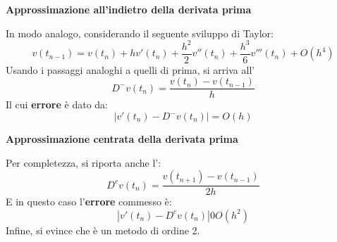\highspace
\begin{flushleft}
	\textcolor{Red2}{ \textbf{Approssimazione all'indietro della derivata prima}}
\end{flushleft}
In modo analogo, considerando il seguente sviluppo di Taylor:
\begin{equation*}
	v\left(t_{n-1}\right) = v\left(t_{n}\right) + hv'\left(t_{n}\right) + \dfrac{h^{2}}{2} v''\left(t_{n}\right) + \dfrac{h^{3}}{6} v'''\left(t_{n}\right) + O\left(h^{4}\right)
\end{equation*}
Usando i passaggi analoghi a quelli di prima, si arriva all'
\begin{equation}\label{eq: approssimazione all'indietro della derivata prima}
	D^{-}v\left(t_{n}\right) = \dfrac{v\left(t_{n}\right) - v\left(t_{n-1}\right)}{h}
\end{equation}
Il cui \textbf{errore} è dato da:
\begin{equation}
	\left|v'\left(t_{n}\right) - D^{-}v\left(t_{n}\right)\right| = O\left(h\right)
\end{equation}

\highspace
\begin{flushleft}
	\textcolor{Red2}{ \textbf{Approssimazione centrata della derivata prima}}
\end{flushleft}
Per completezza, si riporta anche l':
\begin{equation}\label{eq: approssimazione centrata della derivata prima}
	D^{c}v\left(t_{n}\right) = \dfrac{v\left(t_{n+1}\right) - v\left(t_{n-1}\right)}{2h}
\end{equation}
E in questo caso l'\textbf{errore} commesso è:
\begin{equation}
	\left|v'\left(t_{n}\right) - D^{c}v\left(t_{n}\right)\right| 0 O\left(h^{2}\right)
\end{equation}
Infine, si evince che è un metodo di ordine 2.


